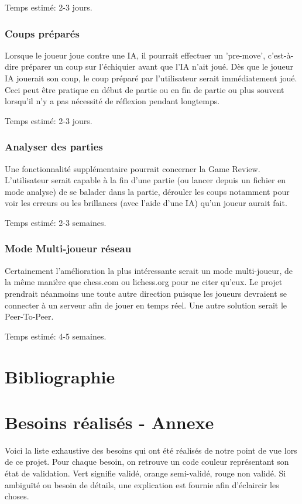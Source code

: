 \documentclass{article}
\begin{document}
Temps estimé: 2-3 jours.

\subsubsection{Coups préparés}
Lorsque le joueur joue contre une IA, il pourrait effectuer un 'pre-move', c'est-à-dire préparer un coup sur l'échiquier avant que l'IA n'ait joué. Dès que
le joueur IA jouerait son coup, le coup préparé par l'utilisateur serait immédiatement joué. Ceci peut être pratique en début de partie ou en fin de partie
ou plus souvent lorsqu'il n'y a pas nécessité de réflexion pendant longtemps.

Temps estimé: 2-3 jours.

\subsubsection{Analyser des parties}
Une fonctionnalité supplémentaire pourrait concerner la Game Review. L'utilisateur serait capable à la fin d'une partie (ou lancer depuis un fichier en mode
analyse) de se balader dans la partie, dérouler les coups notamment pour voir les erreurs ou les brillances (avec l'aide d'une IA) qu'un joueur aurait fait.

Temps estimé: 2-3 semaines.

\subsubsection{Mode Multi-joueur réseau}
Certainement l'amélioration la plus intéressante serait un mode multi-joueur, de la même manière que chess.com ou lichess.org pour ne citer qu'eux.
Le projet prendrait néanmoins une toute autre direction puisque les joueurs devraient se connecter à un serveur afin de jouer en temps réel. Une
autre solution serait le Peer-To-Peer.

Temps estimé: 4-5 semaines.

\pagebreak
\section{Bibliographie}
 
 

\pagebreak
\section{Besoins réalisés - Annexe}
\label{Spec}

Voici la liste exhaustive des besoins qui ont été réalisés de notre point de vue lors de ce projet. Pour chaque besoin, on retrouve un code couleur représentant
son état de validation. Vert signifie validé, orange semi-validé, rouge non validé. Si ambiguïté ou besoin de détails, une explication
est fournie afin d'éclaircir les choses.
\end{document}
